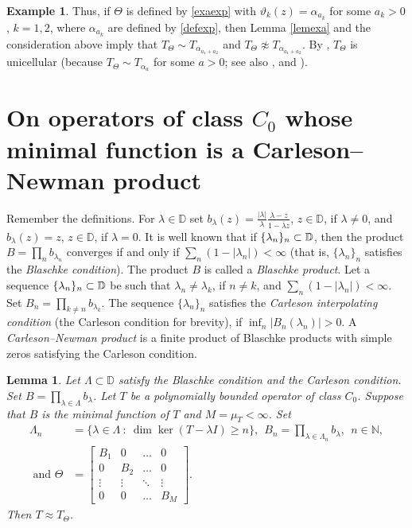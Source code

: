 \documentclass[a4paper,oneside,11pt]{amsart}
\numberwithin{equation}{section}
\theoremstyle{plain}
\newtheorem{lemma}[theorem]{Lemma}
\theoremstyle{definition}
\newtheorem{example}[theorem]{Example}
\begin{document}
\begin{example}
Thus, if $\Theta$ is defined by \eqref{exaexp} with 
 $\vartheta_k(z)=\alpha_{a_k}$ for some $a_k>0$, $k=1,2$, where  $\alpha_{a_k}$ are defined by \eqref{defexp}, 
then Lemma  \ref{lemexa} and the consideration above imply that $T_\Theta\sim T_{\alpha_{a_1+a_2}}$ and 
$T_\Theta\not\approx T_{\alpha_{a_1+a_2}}$. By {\cite[Exersices IV.1.13 and IV.1.14]{berc}}, $T_\Theta$ is unicellular (because $T_\Theta\sim T_{\alpha_a}$ for some $a>0$; see also {\cite[Sec. III.7.2]{sznfbk}}, {\cite[Sec. IV.3]{nik86}} and 
{\cite[Proposition VII.1.21]{berc}}). 
\end{example}

\section{On operators of class $C_0$ whose minimal function is a Carleson--Newman product}

Remember the definitions. 
For $\lambda\in\mathbb D$ set 
$b_\lambda(z)= \frac{|\lambda|}{\lambda}\frac{\lambda-z}{1-\overline\lambda z}$, $z\in\mathbb D$, 
if $\lambda\neq 0$,  and $b_\lambda(z)=z$, $z\in\mathbb D$, if $\lambda=0$.
It is well known that if $\{\lambda_n\}_n\subset\Bbb D$, then  the product $B=\prod_nb_{\lambda_n}$  converges if and only if 
 $\sum_n(1-|\lambda_n|)<\infty$ (that is, $\{\lambda_n\}_n$ satisfies the \emph{Blaschke condition}). The product 
 $B$ is called a \emph{Blaschke product}. 
Let a sequence $\{\lambda_n\}_n\subset\Bbb D$ be such that  $\lambda_n\neq\lambda_k$, if $n\neq k$, 
and  $\sum_n(1-|\lambda_n|)<\infty$.  
  Set $B_n=\prod_{k\neq n}b_{\lambda_k}$. The sequence $\{\lambda_n\}_n$ 
satisfies the \emph{Carleson interpolating condition} (the Carleson condition for brevity), if $\inf_n|B_n(\lambda_n)|>0$. 
A \emph{Carleson--Newman product} is a finite 
product of Blaschke products with simple zeros satisfying the Carleson condition.  


\begin{lemma}\label{lemblaschke} Let  $\Lambda\subset\mathbb D$ satisfy  
the  Blaschke  condition and the Carleson condition. 
  Set $B=\prod_{\lambda\in\Lambda}b_\lambda$. Let $T$ be a polynomially bounded operator of class $C_0$. Suppose that 
$B$ is the minimal  function of $T$ and $M=\mu_T<\infty$. 
Set
\begin{align*} \Lambda_n& =\{\lambda\in\Lambda \ :\ \dim\ker (T-\lambda I)\geq n\}, 
\ \   B_n=\prod_{\lambda\in\Lambda_n}b_\lambda, \ \ n\in\mathbb N, \\ \text{ and } 
\Theta&=\left[ \begin{matrix} B_1  & 0 & \ldots & 0 \\ 
0 & B_2 & \ldots & 0\\ 
\vdots & \vdots &\ddots &\vdots \\
 0 & 0 & \ldots & B_M
 \end{matrix}\right]. 
\end{align*} 
Then $T\approx T_\Theta$. 
\end{lemma}
\end{document}
